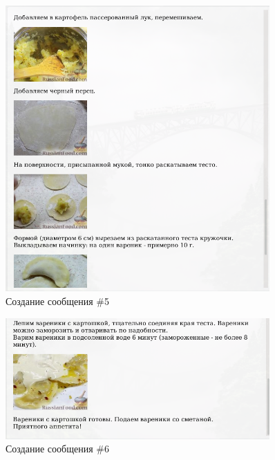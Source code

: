 \documentclass[14pt]{extarticle}
\begin{document}
\begin{figure}[h]
    \centering
	\includegraphics[width=0.9\textwidth, angle=0]{2021-12-12_22-02_2}
    \caption{Создание сообщения \#5}
    \label{fig:html9}
\end{figure}

\begin{figure}[h]
    \centering
	\includegraphics[width=0.9\textwidth, angle=0]{2021-12-12_22-02_3}
    \caption{Создание сообщения \#6}
    \label{fig:html10}
\end{figure}
\end{document}
